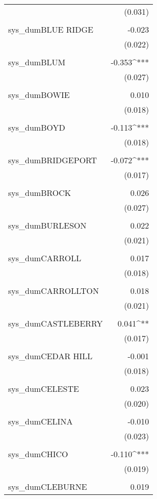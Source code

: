 \begin{table}[!htbp]
\begin{tabular}{@{\extracolsep{5pt}}lD{.}{.}{-3} }
  & (0.031) \\ 
  & \\ 
 sys\_dumBLUE RIDGE & -0.023 \\ 
  & (0.022) \\ 
  & \\ 
 sys\_dumBLUM & -0.353^{***} \\ 
  & (0.027) \\ 
  & \\ 
 sys\_dumBOWIE & 0.010 \\ 
  & (0.018) \\ 
  & \\ 
 sys\_dumBOYD & -0.113^{***} \\ 
  & (0.018) \\ 
  & \\ 
 sys\_dumBRIDGEPORT & -0.072^{***} \\ 
  & (0.017) \\ 
  & \\ 
 sys\_dumBROCK & 0.026 \\ 
  & (0.027) \\ 
  & \\ 
 sys\_dumBURLESON & 0.022 \\ 
  & (0.021) \\ 
  & \\ 
 sys\_dumCARROLL & 0.017 \\ 
  & (0.018) \\ 
  & \\ 
 sys\_dumCARROLLTON & 0.018 \\ 
  & (0.021) \\ 
  & \\ 
 sys\_dumCASTLEBERRY & 0.041^{**} \\ 
  & (0.017) \\ 
  & \\ 
 sys\_dumCEDAR HILL & -0.001 \\ 
  & (0.018) \\ 
  & \\ 
 sys\_dumCELESTE & 0.023 \\ 
  & (0.020) \\ 
  & \\ 
 sys\_dumCELINA & -0.010 \\ 
  & (0.023) \\ 
  & \\ 
 sys\_dumCHICO & -0.110^{***} \\ 
  & (0.019) \\ 
  & \\ 
 sys\_dumCLEBURNE & 0.019 \\ 

\end{tabular}
\end{table}

